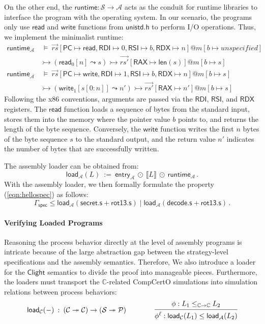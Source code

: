 \documentclass[acmsmall,screen,review,anonymous,nonacm]{acmart}
\newcommand{\kw}[1]{\ensuremath{ \mathsf{#1} }}
\begin{document}
On the other end,
the $\kw{runtime} : \mathcal{S} \rightarrow \mathcal{A}$
acts as the conduit for runtime libraries
to interface the program with the operating system.
In our scenario,
the programs only use $\kw{read}$ and $\kw{write}$
functions from $\kw{unistd.h}$
to perform I/O operations.
Thus, we implement the minimalist runtime:
{\footnotesize
\begin{align*}
  \kw{runtime}_\mathcal{A} & \:\vDash\:
  \vec{rs}[\kw{PC} \mapsto \kw{read},
    \kw{RDI} \mapsto 0,
    \kw{RSI} \mapsto b,
    \kw{RDX} \mapsto n]@m[b \mapsto unspecified] \\
  & \rightarrowtail (\kw{read}_0[n] \leadsto s)
    \rightarrowtail \vec{rs'}[\kw{RAX} \mapsto \kw{len}(s)]@m[b \mapsto s] \\
  \kw{runtime}_\mathcal{A} & \:\vDash\:
    \vec{rs}[\kw{PC} \mapsto \kw{write},
    \kw{RDI} \mapsto 1,
    \kw{RSI} \mapsto b,
    \kw{RDX} \mapsto n]@m[b \mapsto s] \\ 
 &  \rightarrowtail
  (\kw{write}_1[s[0:n]] \leadsto n')
  \rightarrowtail \vec{rs'}[\kw{RAX} \mapsto n']@m[b \mapsto s]
\end{align*}
}
Following the x86 conventions,
arguments are passed via
the \kw{RDI}, \kw{RSI}, and \kw{RDX} registers.
The \kw{read} function
loads a sequence of bytes
from the standard input,
stores them into the memory
where the pointer value $b$ points to,
and returns the length of the byte sequence.
Conversely, the \kw{write} function
writes the first $n$ bytes
of the byte sequence $s$
to the standard output,
and the return value $n'$ indicates
the number of bytes that are successfully written.

The assembly loader can be obtained from:
\[
  \kw{load}_\mathcal{A}(L)
  \::=\: \kw{entry}_\mathcal{A} \: \odot \: \llbracket L \rrbracket
  \: \odot \: \kw{runtime}_\mathcal{A}
  \,.
\]
With the assembly loader,
we then formally formulate the property (\ref{eqn:hellospec})
as follows:
\[
\Gamma_\kw{spec} \le \kw{load}_\mathcal{A}(\kw{secret.s} + \kw{rot13.s})
\mid \kw{load}_\mathcal{A}(\kw{decode.s} + \kw{rot13.s})
\,.
\]

\paragraph{Verifying Loaded Programs}

Reasoning the process behavior
directly at the level of assembly programs
is intricate because of
the large abstraction gap between
the strategy-level specifications
and the assembly semantics.
Therefore,
We also introduce a loader
for the $\kw{Clight}$ semantics
to divide the proof
into manageable pieces.
Furthermore, the loaders
must transport
the $\mathbb{C}$-related CompCertO simulations
into
simulation relations
between process behaviors:
\[
  \kw{load}_\mathcal{C}(-)
  \: : \:
  (\mathcal{C} \twoheadrightarrow \mathcal{C}) \rightarrow (\mathcal{S} \twoheadrightarrow \mathcal{P})
  \qquad \qquad
  \begin{prooftree}
    \hypo{\phi: L_1 \le_{\mathbb{C} \rightarrow \mathbb{C}} L_2}
    \infer1{\phi^\ell: \kw{load}_\mathcal{C}(L_1) \le
      \kw{load}_\mathcal{A}(L_2)}
  \end{prooftree}
\]%
\end{document}
